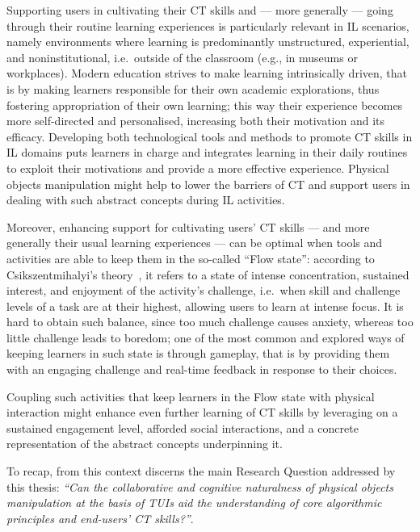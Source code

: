 Supporting users in cultivating their \ac{CT} skills and --- more generally --- going through their routine learning experiences is particularly relevant in \ac{IL} scenarios, namely environments where learning is predominantly unstructured, experiential, and noninstitutional, i.e.\ outside of the classroom (e.g., in museums or workplaces). Modern education strives to make learning intrinsically driven, that is by making learners responsible for their own academic explorations, thus fostering appropriation of their own learning; this way their experience becomes more self-directed and personalised, increasing both their motivation and its efficacy. Developing both technological tools and methods to promote \ac{CT} skills in \ac{IL} domains puts learners in charge and integrates learning in their daily routines to exploit their motivations and provide a more effective experience. Physical objects manipulation might help to lower the barriers of \ac{CT} and support users in dealing with such abstract concepts during \ac{IL} activities.

Moreover, enhancing support for cultivating users' \ac{CT} skills --- and more generally their usual learning experiences --- can be optimal when tools and activities are able to keep them in the so-called ``Flow state'': according to Csikszentmihalyi's theory~\cite{nakamura2014concept}, it refers to a state of intense concentration, sustained interest, and enjoyment of the activity's challenge, i.e.\ when skill and challenge levels of a task are at their highest, allowing users to learn at intense focus. It is hard to obtain such balance, since too much challenge causes anxiety, whereas too little challenge leads to boredom; one of the most common and explored ways of keeping learners in such state is through gameplay, that is by providing them with an engaging challenge and real-time feedback in response to their choices.

Coupling such activities that keep learners in the Flow state with physical interaction might enhance even further learning of \ac{CT} skills by leveraging on a sustained engagement level, afforded social interactions, and a concrete representation of the abstract concepts underpinning it.

To recap, from this context discerns the main Research Question addressed by this thesis: \textit{``Can the collaborative and cognitive naturalness of physical objects manipulation at the basis of \aclp{TUI} aid the understanding of core algorithmic principles and  end-users' \acl{CT} skills?''}.

